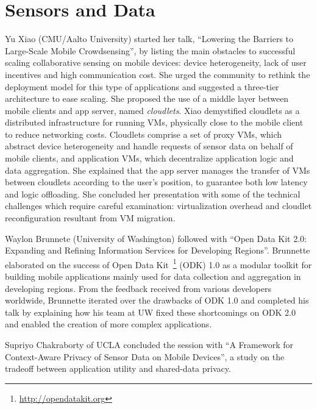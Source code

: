 \section{Sensors and Data}
\label{sec:sensors}


Yu Xiao (CMU/Aalto University) started her talk, ``Lowering the Barriers
to Large-Scale Mobile Crowdsensing'', by listing the main obstacles to
successful scaling collaborative sensing on mobile devices: device
heterogeneity, lack of user incentives and high communication cost. She
urged the community to rethink the deployment model for this type of
applications and suggested a three-tier architecture to ease scaling.
She proposed the use of a middle layer between mobile clients and app
server, named \emph{cloudlets}. Xiao demystified cloudlets as a
distributed infrastructure for running VMs, physically close to the
mobile client to reduce networking costs. Cloudlets comprise a set of
proxy VMs, which abstract device heterogeneity and handle requests of
sensor data on behalf of mobile clients, and application VMs, which
decentralize application logic and data aggregation. She explained that
the app server manages the transfer of VMs between cloudlets according
to the user's position, to guarantee both low latency and logic
offloading. She concluded her presentation with some of the technical
challenges which require careful examination: virtualization overhead
and cloudlet reconfiguration resultant from VM migration.

Waylon Brunnete (University of Washington) followed with ``Open Data Kit
2.0: Expanding and Refining Information Services for Developing
Regions''. Brunnette elaborated on the success of Open Data
Kit~\footnote{\url{http://opendatakit.org}} (ODK) 1.0 as a modular
toolkit for building mobile applications mainly used for data collection
and aggregation in developing regions. From the feedback received from
various developers worldwide, Brunnette iterated over the drawbacks of
ODK 1.0 and completed his talk by explaining how his team at UW fixed
these shortcomings on ODK 2.0 and enabled the creation of more complex
applications.


Supriyo Chakraborty of UCLA concluded the session with ``A
Framework for Context-Aware Privacy of Sensor Data on Mobile Devices'',
a study on the tradeoff between application utility and shared-data
privacy.

